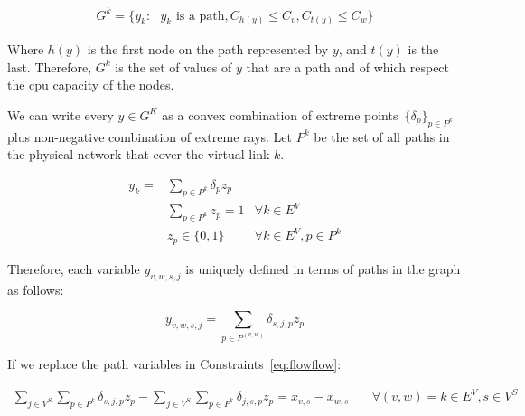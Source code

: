\begin{align}
  G^k = \{ y_{k} : \text{ $y_{k}$ is a path}, C_{h(y)} \leq C_{v}, C_{t(y)} \leq C_{w} \}
\end{align}

Where $h(y)$ is the first node on the path represented by $y$, and $t(y)$ is the last. Therefore, $G^k$ is the set of values of $y$ that are a path and of which respect the cpu capacity of the nodes.


We can write every $y \in G^K$ as a convex combination of extreme points~$\{\delta_p\}_{p \in P^k}$ plus  non-negative combination of extreme rays.
Let $P^k$ be the set of all paths in the physical network that cover the virtual link $k$.

\begin{align}
  y_{k} = & \sum\limits_{p \in P^{k}} \delta_{p} z_{p} \label{eq:yk} & \\
          & \sum\limits_{p \in P^k} z_{p} = 1 & \forall k \in E^V \\
          & z_{p} \in \{0,1\}                       & \forall k \in E^V, p \in P^k
\end{align}


Therefore, each variable $y_{v,w,s,j}$ is uniquely defined in terms of paths in the graph as follows:

\begin{equation}
  y_{v,w,s,j} = \sum\limits_{p \in P^{(v,w)}} \delta_{s,j,p} z_{p} \label{eq:definition}
\end{equation}

If we replace the path variables in Constraints~\ref{eq:flowflow}:

\begin{align}
  \sum\limits_{j \in V^{S}} \sum\limits_{p \in P^k} \delta_{s,j,p} z_{p} - \sum\limits_{j \in V^{S}}\sum\limits_{p \in P^k} \delta_{j,s,p} z_{p} = x_{v,s} - x_{w,s}     & \quad \forall (v,w) = k \in E^{V}, s \in V^{S} \label{eq:flowwithpathvar}
\end{align}

